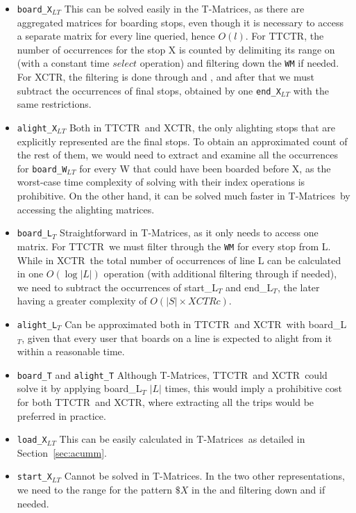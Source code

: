 \documentclass[runningheads]{llncs}
\newcommand{\acumm}{T-Matrices} %
\newcommand{\ctr}{XCTR}
\newcommand{\ttctr}{TTCTR}
\newcommand{\ctrq}{XCTRc}
\begin{document}
\begin{itemize}
    \item \texttt{board\_X$_{LT}$} This can be solved easily in the \acumm, as there are aggregated matrices for boarding stops, even though it is necessary to access a separate matrix for every line queried, hence $O(l)$. For \ttctr, the number of occurrences for the stop X is counted by delimiting its range on  (with a constant time $select$ operation) and filtering down the \texttt{WM} if needed. For \ctr, the filtering is done through  and , and after that we must subtract the occurrences of final stops, obtained by one \texttt{end\_X$_{LT}$} with the same restrictions.
    \item \texttt{alight\_X$_{LT}$} Both in \ttctr~and \ctr, the only alighting stops that are explicitly represented are the final stops. To obtain an approximated count of the rest of them, we would need to extract and examine all the occurrences for \texttt{board\_W$_{LT}$} for every W that could have been boarded before X, as the worst-case time complexity of solving with their index operations is prohibitive. On the other hand, it can be solved much faster in \acumm~by accessing the alighting matrices.
    \item \texttt{board\_L$_T$} Straightforward in \acumm, as it only needs to access one matrix. For \ttctr~we must filter through the \texttt{WM} for every stop from L. While in \ctr~the total number of occurrences of line L can be calculated in one $O(\log|L|)$ operation (with additional filtering through  if needed), we need to subtract the occurrences of start\_L$_T$ and end\_L$_T$, the later having a greater complexity of $O(|S| \times \ctrq)$.
    \item \texttt{alight\_L$_T$} Can be approximated both in \ttctr~and \ctr~with board\_L$_T$, given that every user that boards on a line is expected to alight from it within a reasonable time.
    \item \texttt{board\_T} and \texttt{alight\_T} Although \acumm, \ttctr~and \ctr~could solve it by applying board\_L$_T$ $|L|$ times, this would imply a prohibitive cost for both \ttctr~and \ctr, where extracting all the trips would be preferred in practice.
    \item \texttt{load\_X$_{LT}$} This can be easily calculated in \acumm~as detailed in Section~\ref{sec:acumm}. 
    \item \texttt{start\_X$_{LT}$} Cannot be solved in \acumm. In the two other representations, we need to the range for the pattern $\$X$ in the  and filtering down  and  if needed.

\end{itemize}
\end{document}
